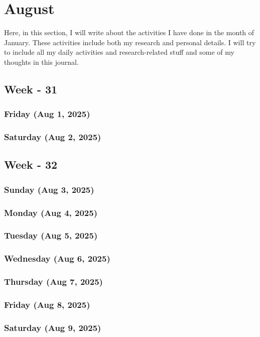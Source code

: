 \chapter{August}
\label{chap:August}
\hspace{1cm}
Here, in this section, I will write about the activities I have done in the month of January\cite{zhou2015}. These activities include both my research and personal details. I will try to include all my daily activities and research-related stuff and some of my thoughts in this journal.
\section{Week - 31}
\subsection*{Friday (Aug 1, 2025)}
\subsection*{Saturday (Aug 2, 2025)}

\section{Week - 32}
\subsection*{Sunday (Aug 3, 2025)}
\subsection*{Monday (Aug 4, 2025)}
\subsection*{Tuesday (Aug 5, 2025)}
\subsection*{Wednesday (Aug 6, 2025)}
\subsection*{Thursday (Aug 7, 2025)}
\subsection*{Friday (Aug 8, 2025)}
\subsection*{Saturday (Aug 9, 2025)}

